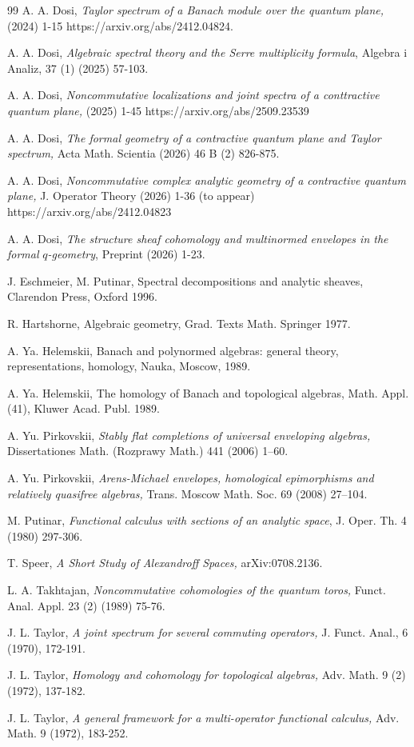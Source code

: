 \documentclass[12pt]{amsart}%
\theoremstyle{plain}
\numberwithin{equation}{section}
\numberwithin{equation}{section}
\numberwithin{theorem}{section}
\numberwithin{lemma}{section}
\numberwithin{remark}{section}
\numberwithin{example}{section}
\numberwithin{proposition}{section}
\numberwithin{definition}{section}
\numberwithin{corollary}{section}
\begin{document}
\begin{thebibliography}{99}
A. A. Dosi, \textit{Taylor spectrum of a Banach module over
the quantum plane,} (2024) 1-15 https://arxiv.org/abs/2412.04824.

A. A. Dosi, \textit{Algebraic spectral theory and the Serre
multiplicity formula}, Algebra i Analiz, 37 (1) (2025) 57-103.

A. A. Dosi, \textit{Noncommutative localizations and joint
spectra of a conttractive quantum plane, }(2025) 1-45 https://arxiv.org/abs/2509.23539

A. A. Dosi, \textit{The formal geometry of a contractive
quantum plane and Taylor spectrum, }Acta Math. Scientia (2026) 46 B (2) 826-875.

A. A. Dosi, \textit{Noncommutative complex analytic geometry
of a contractive quantum plane, }J. Operator Theory (2026) 1-36 (to appear) https://arxiv.org/abs/2412.04823

A. A. Dosi, \textit{The structure sheaf cohomology and
multinormed envelopes in the formal }$q$\textit{-geometry}, Preprint (2026) 1-23.

J. Eschmeier, M. Putinar, Spectral decompositions and analytic
sheaves, Clarendon Press, Oxford 1996.

R. Hartshorne, Algebraic geometry, Grad. Texts Math. Springer 1977.

A. Ya. Helemskii, Banach and polynormed algebras: general
theory, representations, homology, Nauka, Moscow, 1989.

A. Ya. Helemskii, The homology of Banach and topological
algebras, Math. Appl. (41), Kluwer Acad. Publ. 1989.

A. Yu. Pirkovskii, \textit{Stably flat completions of
universal enveloping algebras,} Dissertationes Math. (Rozprawy Math.) 441
(2006) 1--60.

A. Yu. Pirkovskii, \textit{Arens-Michael envelopes, homological
epimorphisms and relatively quasifree algebras, }Trans. Moscow Math. Soc. 69
(2008) 27--104.

M. Putinar, \textit{Functional calculus with sections of an
analytic space}, J. Oper. Th. 4 (1980) 297-306.

T. Speer, \textit{A Short Study of Alexandroff Spaces, }arXiv:0708.2136.

L. A. Takhtajan, \textit{Noncommutative cohomologies of the
quantum toros,} Funct. Anal. Appl. 23 (2) (1989) 75-76.

J. L. Taylor, \textit{A joint spectrum for several commuting
operators, }J. Funct. Anal., 6 (1970), 172-191.

J. L. Taylor, \textit{Homology and cohomology for topological
algebras, }Adv. Math. 9 (2) (1972), 137-182.

J. L. Taylor, \textit{A general framework for a multi-operator
functional calculus,} Adv. Math. 9 (1972), 183-252.
\end{thebibliography}
\end{document}
